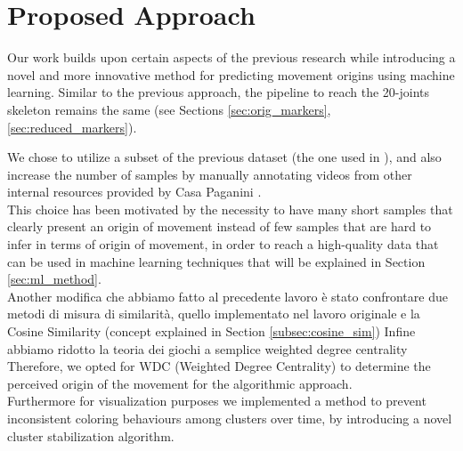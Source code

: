 \chapter{Proposed Approach}

Our work builds upon certain aspects of the previous research while introducing a novel and more innovative method for predicting movement origins using machine learning. 
Similar to the previous approach, the pipeline to reach the 20-joints skeleton remains the same (see Sections \ref{sec:orig_markers}, \ref{sec:reduced_markers}).

We chose to utilize a subset of the previous dataset (the one used in \cite{kolykhalova:2020}), and also increase the number of samples by manually annotating videos from other internal resources provided by Casa Paganini \cite{casaPaganini}.\\ 
This choice has been motivated by the necessity to have many short samples that clearly present an origin of movement instead of few samples that are hard to infer in terms of origin of movement, in order to 
reach a high-quality data that can be used in machine learning techniques that will be explained in Section \ref{sec:ml_method}.\\
Another modifica che abbiamo fatto al precedente lavoro è stato confrontare due metodi di misura di similarità, quello implementato nel lavoro originale e la Cosine Similarity (concept explained in Section \ref{subsec:cosine_sim})
Infine abbiamo ridotto la teoria dei giochi a semplice weighted degree centrality
Therefore, we opted for WDC (Weighted Degree Centrality) to determine the perceived origin of the movement for the algorithmic approach.\\
Furthermore for visualization purposes we implemented a method to prevent inconsistent coloring behaviours among clusters over time, by introducing a novel cluster stabilization algorithm. 

